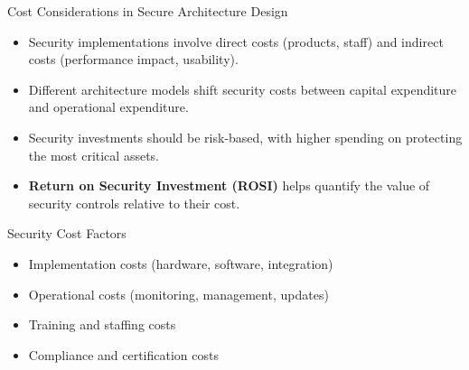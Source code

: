 \documentclass{beamer}
\begin{document}
            \begin{frame}{Cost Considerations in Secure Architecture Design}
                \begin{itemize}
                \item Security implementations involve direct costs (products, staff) and indirect costs (performance impact, usability).
                \item Different architecture models shift security costs between capital expenditure and operational expenditure.
                \item Security investments should be risk-based, with higher spending on protecting the most critical assets.
                \item \textbf{Return on Security Investment (ROSI)} helps quantify the value of security controls relative to their cost.
                \end{itemize}
                
                \begin{block}{Security Cost Factors}
                \begin{itemize}
                \item Implementation costs (hardware, software, integration)
                \item Operational costs (monitoring, management, updates)
                \item Training and staffing costs
                \item Compliance and certification costs
                \end{itemize}
                \end{block}
                \end{frame}
                
\end{document}
